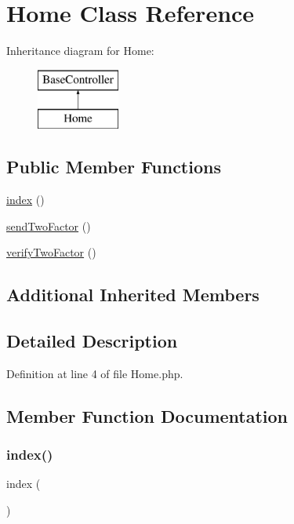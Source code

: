 \hypertarget{class_home}{}\section{Home Class Reference}
\label{class_home}
Inheritance diagram for Home\+:\begin{figure}[H]
\begin{center}
\leavevmode
\includegraphics[height=2.000000cm]{class_home}
\end{center}
\end{figure}
\subsection*{Public Member Functions}
\begin{DoxyCompactItemize}
\item 
\hyperlink{class_home_a149eb92716c1084a935e04a8d95f7347}{index} ()
\item 
\hyperlink{class_home_a0ccc4e0612aa629f4bb0e3412fdd46f1}{send\+Two\+Factor} ()
\item 
\hyperlink{class_home_a16f4f4a606ac2b46c064188b783da88c}{verify\+Two\+Factor} ()
\end{DoxyCompactItemize}
\subsection*{Additional Inherited Members}


\subsection{Detailed Description}


Definition at line 4 of file Home.\+php.



\subsection{Member Function Documentation}
\hypertarget{class_home_a149eb92716c1084a935e04a8d95f7347}{}\label{class_home_a149eb92716c1084a935e04a8d95f7347} 
\subsubsection{\texorpdfstring{index()}{index()}}
{\footnotesize\ttfamily index (\begin{DoxyParamCaption}{ }\end{DoxyParamCaption})}



